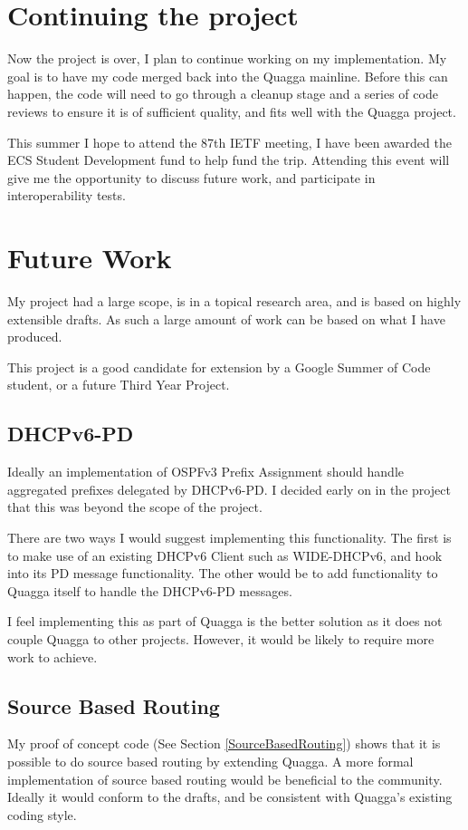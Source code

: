 \documentclass[12pt,a4paper,twoside]{report}
\begin{document}
\section{Continuing the project}
Now the project is over, I plan to continue working on my implementation. My
goal is to have my code merged back into the Quagga mainline. Before this can
happen, the code will need to go through a cleanup stage and a series of code
reviews to ensure it is of sufficient quality, and fits well with the Quagga
project.

This summer I hope to attend the 87th IETF meeting, I have been awarded
the ECS Student Development fund to help fund the trip. Attending this event
will give me the opportunity to discuss future work, and participate in
interoperability tests.

\section{Future Work}
My project had a large scope, is in a topical research area, and is based on
highly extensible drafts. As such a large amount of work can be based on what I
have produced. 

This project is a good candidate for extension by a Google Summer of Code
student, or a future Third Year Project. 

\subsection{DHCPv6-PD}
Ideally an implementation of OSPFv3 Prefix Assignment should handle aggregated
prefixes delegated by DHCPv6-PD\@. I decided early on in the project that this
was beyond the scope of the project. 

There are two ways I would suggest implementing this functionality. The first
is to make use of an existing DHCPv6 Client such as WIDE-DHCPv6, and hook into
its PD message functionality. The other would be to add functionality to Quagga
itself to handle the DHCPv6-PD messages. 

I feel implementing this as part of Quagga is the better solution as it does
not couple Quagga to other projects. However, it would be likely to require
more work to achieve.

\subsection{Source Based Routing} 
My proof of concept code (See Section \ref{SourceBasedRouting}) shows that it
is possible to do source based routing by extending Quagga. A more formal
implementation of source based routing would be beneficial to the community.
Ideally it would conform to the drafts, and be consistent with Quagga's
existing coding style. 
\end{document}
